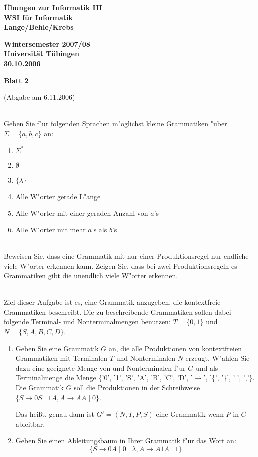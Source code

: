 \documentclass[a4paper]{article}
\def\header#1#2#3{\pagestyle{empty}
\noindent
\begin{minipage}[t]{0.6\textwidth}
\begin{flushleft}
\bf \"Ubungen zur Informatik III\\
WSI f\"ur Informatik\\
Lange/Behle/Krebs
\end{flushleft}
\end{minipage}
\begin{minipage}[t]{0.4\textwidth}
\begin{flushright}
\bf Wintersemester 2007/08\\
Universit\"at T\"ubingen\\
#2 %
\end{flushright}
\end{minipage}

\begin{center}
{\Large\bf Blatt #1}

{(Abgabe am #3)}
\end{center}
}
\begin{document}
\header{2}{30.10.2006}{6.11.2006}


\bigskip




\\
Geben Sie f"ur folgenden Sprachen m"oglichst kleine Grammatiken "uber\linebreak $\Sigma=\{a,b,c\}$ an:
\begin{enumerate}
\item $\Sigma^*$
\item $\emptyset$
\item $\{\lambda\}$
\item Alle W"orter gerade L"ange
\item Alle W"orter mit einer geraden Anzahl von $a$'s
\item Alle W"orter mit mehr $a$'s als $b$'s
\end{enumerate}

\bigskip

\\
Beweisen Sie, dass eine Grammatik mit nur einer Produktionsregel nur endliche viele W"orter erkennen kann.
Zeigen Sie, dass bei zwei Produktionsregeln es Grammatiken gibt die unendlich viele W"orter erkennen.

\bigskip

\\
Ziel dieser Aufgabe ist es, eine Grammatik anzugeben, die kontextfreie Grammatiken beschreibt. Die zu beschreibende Grammatiken sollen dabei folgende Terminal- und Nonterminalmengen benutzen: $T=\{0,1\}$ und $N=\{S,A,B,C,D\}$.

\begin{enumerate}
\item Geben Sie eine Grammatik $G$ an, die alle Produktionen von kontextfreien Grammatiken mit Terminalen $T$ und Nonterminalen $N$ erzeugt. W"ahlen Sie dazu eine geeignete Menge von und Nonterminalen f"ur $G$ und als Terminalmenge die Menge $\{$'0', '1', 'S', 'A', 'B', 'C', 'D', '$\rightarrow$', '\{', '\}', '$\mid$', ','$\}$. Die Grammatik $G$ soll die Produktionen in der Schreibweise $\{S \rightarrow 0S\mid 1A, A \rightarrow AA\mid 0\}$.

Das hei{\ss}t, genau dann ist $G'=(N,T,P,S)$ eine Grammatik wenn $P$ in $G$ ableitbar.
\item Geben Sie einen Ableitungsbaum in Ihrer Grammatik f"ur das Wort an:
$$\{S \rightarrow 0A\mid 0\mid \lambda, A\rightarrow A1A\mid  1 \}$$
\end{enumerate}
\end{document}
